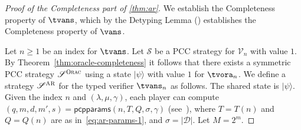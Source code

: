 \documentclass[11pt]{article}
\theoremstyle{definition}
\newcommand{\ket}[1]{|#1\rangle}
\newcommand{\abs}[1]{\left\vert {#1} \right\vert}
\newcommand{\decider}{\mathcal{D}}
\newcommand{\verifier}{\mathcal{V}}
\newcommand{\strategy}{\mathscr{S}}
\newcommand{\gamestyle}[1]{\ensuremath{\textsc{#1}}\xspace}
\newcommand{\ora}{\gamestyle{Orac}}
\newcommand{\ar}{\gamestyle{AR}}
\newcommand{\pcpparams}{\mathsf{pcpparams}}
\newcommand{\qlen}{Q}
\begin{document}
\begin{proof}[Proof of the Completeness part of \cref{thm:ar}]
We establish the Completeness property of $\tvans$, which by the Detyping
  Lemma () establishes the Completeness property of
  $\vans$.

  Let $n\geq 1$ be an index for $\tvans$.
  Let $\strategy$ be a PCC strategy for $\verifier_n$ with value $1$.
  By Theorem~\ref{thm:oracle-completeness} it follows that there exists a
  symmetric PCC strategy $\strategy^\ora$ using a state $\ket{\psi}$ with value
  $1$ for $\tvora_n$.
  We define a strategy $\strategy^\ar$ for the typed verifier $\tvans_n$ as
  follows.
  The shared state is $\ket{\psi}$.
  Given the index $n$ and $(\lambda,\mu,\gamma)$, each player can compute
  $(q,m,d,m',s) = \pcpparams(n, T, \qlen,\sigma,\gamma)$
  (see~), where $T=T(n)$ and $Q=Q(n)$ are as
  in~\eqref{eq:ar-params-1}, and $\sigma = \abs{\decider}$.
  Let $M = 2^m$.


\end{proof}
\end{document}
